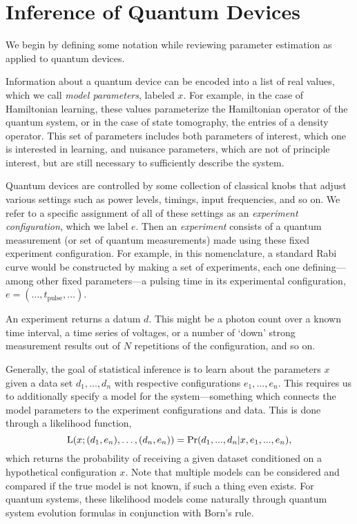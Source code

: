 \documentclass[aps,nofootinbib,prl,twocolumn,superscriptaddress]{revtex4}
\newcommand{\mps}{x}
\newcommand{\eps}{e}
\newcommand{\data}{d}
\begin{document}
\section{Inference of Quantum Devices}
\label{sec:inference}

We begin by defining some notation while reviewing parameter 
estimation as applied to quantum devices.

Information about a quantum device can be encoded into a list of 
real values, which we call \textit{model parameters}, labeled $\mps$.
For example, in the case of Hamiltonian learning, 
these values parameterize the Hamiltonian operator of the 
quantum system, or in the case of 
state tomography, the entries of a density operator.
This set of parameters includes both parameters of interest, which 
one is interested in learning, and nuisance parameters, which are
not of principle interest, but are still necessary to sufficiently 
describe the system.

Quantum devices are controlled by some collection of 
classical knobs that adjust various settings 
such as power levels, timings, input frequencies, and so on.
We refer to a specific assignment of all of these settings as an
\textit{experiment configuration}, which we label $\eps$.
Then an \textit{experiment}
consists of a quantum measurement (or set of quantum measurements) 
made using these fixed experiment configuration.
For example, in this nomenclature, a standard Rabi curve 
would be constructed by making a set of 
experiments, each one defining---among other fixed parameters---a 
pulsing time in its experimental configuration, 
$\eps=(\ldots,t_\text{pulse},\ldots)$.

An experiment returns a datum $\data$. 
This might be a photon count
over a known time interval, a time series of voltages, 
or a number of `down' strong measurement results out of $N$ repetitions
of the configuration, and so on.

Generally, the goal of statistical inference is to learn about the parameters
$\mps$ given a data set $\data_1,\ldots,\data_n$ with respective 
configurations $\eps_1,\ldots,\eps_n$.
This requires us to additionally specify a model for the 
system---something which connects the model parameters to the experiment 
configurations and data.
This is done through a likelihood function,
\begin{equation}
    \Lhood(\mps;(\data_1,\eps_n),\ldots,(\data_n,\eps_n))
        = \Pr(\data_1,...,\data_n|\mps,\eps_1,...,\eps_n),
\end{equation} 
which returns the probability of receiving a given dataset conditioned
on a hypothetical configuration $\mps$.
Note that multiple models can be considered and compared if the
true model is not known, if such a thing even exists.
For quantum systems, these likelihood models come naturally
through quantum system evolution formulas in conjunction 
with Born's rule.
\end{document}
